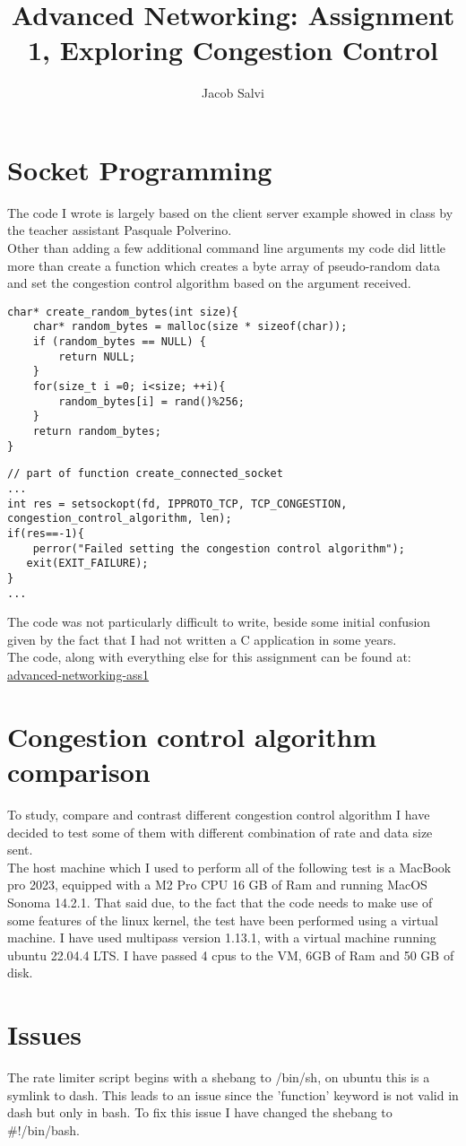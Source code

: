 \documentclass{report}
\title{Advanced Networking: Assignment 1, Exploring Congestion Control}
\author{Jacob Salvi}
\date{}
\begin{document}
\maketitle

\section*{Socket Programming}
The code I wrote is largely based on the client server example showed in class by the teacher assistant Pasquale Polverino.\\ 
Other than adding a few additional command line arguments my code did little more than create a function which creates a byte array of pseudo-random data and set the congestion control algorithm based on the argument received.\\

\begin{verbatim}
char* create_random_bytes(int size){
    char* random_bytes = malloc(size * sizeof(char));
    if (random_bytes == NULL) {
        return NULL;
    }
    for(size_t i =0; i<size; ++i){
        random_bytes[i] = rand()%256;
    }
    return random_bytes;
}
\end{verbatim}

\begin{verbatim}
// part of function create_connected_socket
...
int res = setsockopt(fd, IPPROTO_TCP, TCP_CONGESTION, congestion_control_algorithm, len);
if(res==-1){
    perror("Failed setting the congestion control algorithm");
   exit(EXIT_FAILURE);
}
...
\end{verbatim}
The code was not particularly difficult to write, beside some initial confusion given by the fact that I had not written a C application in some years.\\
The code, along with everything else for this assignment can be found at: \href{https://github.com/JacobSalvi/advanced-networking-ass1}{advanced-networking-ass1}

\section*{Congestion control algorithm comparison}
To study, compare and contrast different congestion control algorithm I have decided to test some of them with different combination of rate and data size sent.\\
The host machine which I used to perform all of the following test is a MacBook pro 2023, equipped with a M2 Pro CPU 16 GB of Ram and running MacOS Sonoma 14.2.1. That said due, to the fact that the code needs to make use of some features of the linux kernel, the test have been performed using a virtual machine. I have used multipass version 1.13.1, with a virtual machine running ubuntu 22.04.4 LTS. I have passed 4 cpus to the VM, 6GB of Ram and 50 GB of disk.\\
\section*{Issues}
The rate limiter script begins with a shebang to /bin/sh, on ubuntu this is a symlink to dash. This leads to an issue since the 'function' keyword is not valid in dash but only in bash. To fix this issue I have changed the shebang to \#!/bin/bash.
\end{document}
